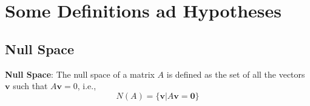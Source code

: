 
\chapter{Some Definitions ad Hypotheses} %

\label{AppendixA} %



\section{Null Space}

\textbf{Null Space}:
The null space of a matrix $A$ is defined as the set of all the vectors $\mathbf{v}$ such that $A\mathbf{v} = 0$, i.e.,
\begin{equation}
N(A) = \{\mathbf{v}|A\mathbf{v}=\mathbf{0}\}
\end{equation}
